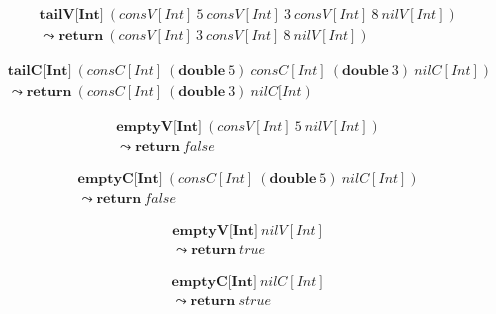 \begin{equation}
    \begin{split}
        & \textbf{tailV[Int]} \ (consV[Int] \ 5 \ consV[Int] \  3 \  consV[Int] \  8 \  nilV[Int]) \\
        & \leadsto \textbf{return} \  (consV[Int] \  3 \  consV[Int] \  8 \  nilV[Int])
    \end{split}
\end{equation}

\begin{equation}
    \begin{split}
        & \textbf{tailC[Int]} \ (consC[Int] \  (\textbf{double}\:5) \ 
 consC[Int] \  (\textbf{double}\:3) \ nilC[Int]) \\
        & \leadsto \textbf{return}\:(consC[Int] \  (\textbf{double}\:3) \ nilC[Int) 
    \end{split}
\end{equation}

\begin{equation}
    \begin{split}
        & \textbf{emptyV[Int]}\:(consV[Int] \ 5 \  nilV[Int]) \\
        & \leadsto \textbf{return}\:false
    \end{split}
\end{equation}

\begin{equation}
    \begin{split}
        & \textbf{emptyC[Int]} \ (consC[Int] \ (\textbf{double}\:5) \ nilC[Int]) \\
        & \leadsto \textbf{return}\:false
    \end{split}
\end{equation}


\begin{equation}
    \begin{split}
        & \textbf{emptyV[Int]} \ nilV[Int] \\
        & \leadsto \textbf{return} \ true
    \end{split}
\end{equation}

\begin{equation}
    \begin{split}
        & \textbf{emptyC[Int]} \ nilC[Int] \\
        & \leadsto \textbf{return} \ strue
    \end{split}
\end{equation}


